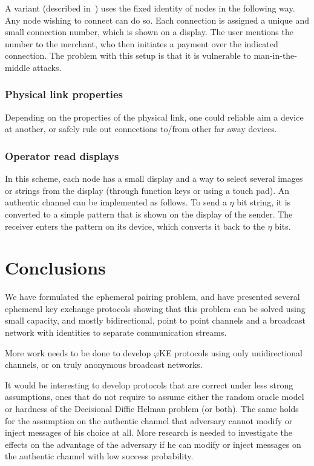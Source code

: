 \documentclass[runningheads,envcountsame,envcountsect,oribibl]{llncs}
\newcommand{\eke}{$\varphi$KE}
\renewcommand{\cap}{\eta}
\begin{document}
A variant (described in~\cite{MeT01}) uses the fixed identity of nodes in the
following way. Any node wishing to connect can do so. Each connection is
assigned a unique and small connection number, which is shown on a display. 
The user mentions the number to the merchant, who then initiates a payment
over the indicated connection. The problem with this setup is that it is
vulnerable to man-in-the-middle attacks.


\subsubsection{Physical link properties}

Depending on the properties of the physical link, one could reliable aim a
device at another, or safely rule out connections to/from other far away
devices. 

\subsubsection{Operator read displays}

In this scheme, each node has a small display and a way to select several
images or strings from the display (through function keys or using a
touch pad). An authentic channel can be implemented as follows. To send a $\cap$
bit string, it is converted to a simple pattern that is shown on the display
of the sender. The receiver enters the pattern on its device, which converts it
back to the $\cap$ bits.


\section{Conclusions}
\label{sec-concl}

We have formulated the ephemeral pairing problem, and have presented several
ephemeral key exchange protocols showing that this problem can be solved using
small capacity, and mostly bidirectional, point to point channels and a
broadcast network with identities to separate communication streams.

More work needs to be done to develop \eke{} protocols using only
unidirectional channels, or on truly anonymous broadcast networks.

It would be interesting to develop protocols that are correct under less 
strong assumptions, \ie ones that do not require to assume either the 
random oracle model or hardness of the Decisional Diffie Helman problem (or
both). The same holds for the assumption on the authentic channel that
adversary cannot modify or inject messages of his choice at all. More research
is needed to investigate the effects on the advantage of the adversary
if he can modify or inject messages on the authentic channel with 
low success probability. 
\end{document}
